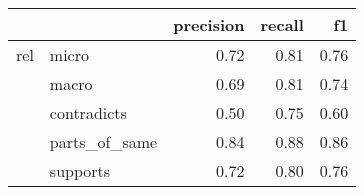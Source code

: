 \begin{tabular}{llrrr}
\toprule
    &          &  precision &  recall &   f1 \\
\midrule
rel & micro &       0.72 &    0.81 & 0.76 \\
    & macro &       0.69 &    0.81 & 0.74 \\
    & contradicts &       0.50 &    0.75 & 0.60 \\
    & parts\_of\_same &       0.84 &    0.88 & 0.86 \\
    & supports &       0.72 &    0.80 & 0.76 \\
\bottomrule
\end{tabular}
